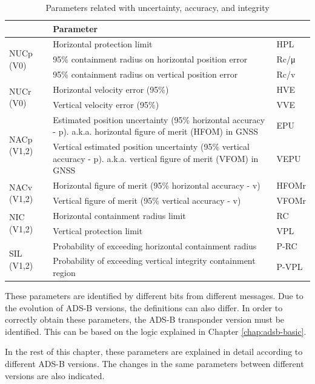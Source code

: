 \begin{table}[ht]
\caption{Parameters related with uncertainty, accuracy, and integrity}
\label{tb:uncertainty-parameters}
\begin{tabularx}{\textwidth}{|l|X|l|}
\hline
\textbf{} & \textbf{Parameter} &  \\ \hline
\multirow{3}{*}{NUCp (V0)} & Horizontal protection limit & HPL \\ \cline{2-3}
 & 95\% containment radius on horizontal position error & Rc/μ \\ \cline{2-3}
 & 95\% containment radius on vertical position error & Rc/v \\ \hline
\multirow{2}{*}{NUCr (V0)} & Horizontal velocity error (95\%) & HVE \\ \cline{2-3}
 & Vertical velocity error (95\%) & VVE \\ \hline
\multirow{2}{*}{NACp (V1,2)} & Estimated position uncertainty (95\% horizontal accuracy - p). a.k.a. horizontal figure of merit (HFOM) in GNSS & EPU \\ \cline{2-3}
 & Vertical estimated position uncertainty (95\% vertical accuracy - p). a.k.a. vertical figure of merit (VFOM) in GNSS & VEPU \\ \hline
\multirow{2}{*}{NACv (V1,2)} & Horizontal figure of merit (95\% horizontal accuracy - v) & HFOMr \\ \cline{2-3}
 & Vertical figure of merit (95\% vertical accuracy - v) & VFOMr \\ \hline
\multirow{2}{*}{NIC (V1,2)} & Horizontal containment radius limit & RC \\ \cline{2-3}
 & Vertical protection limit & VPL \\ \hline
\multirow{2}{*}{SIL (V1,2)} & Probability of exceeding horizontal containment radius & P-RC \\ \cline{2-3}
 & Probability of exceeding vertical integrity containment region & P-VPL \\ \hline
\end{tabularx}
\end{table}

These parameters are identified by different bits from different messages. Due to the evolution of ADS-B versions, the definitions can also differ. In order to correctly obtain these parameters, the ADS-B transponder version must be identified. This can be based on the logic explained in Chapter \ref{chap:adsb-basic}.

In the rest of this chapter, these parameters are explained in detail according to different ADS-B versions. The changes in the same parameters between different versions are also indicated.


